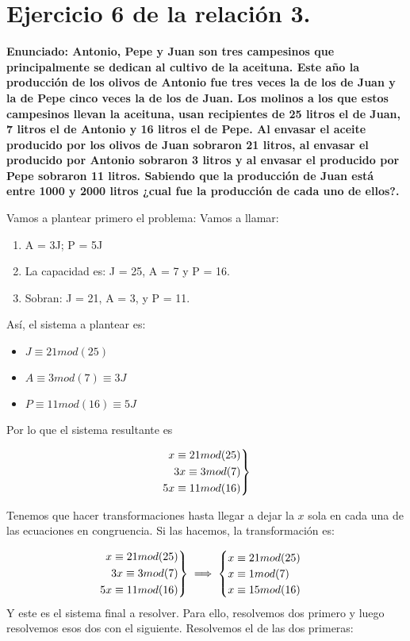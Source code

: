 \documentclass[11pt, a4paper, titlepage]{article}
\theoremstyle{theorem-style}
\theoremstyle{definition-style}
\theoremstyle{remark-style}
\theoremstyle{example-style}
\newenvironment{rcases}
  {\left.\begin{aligned}}
  {\end{aligned}\right\rbrace}
\begin{document}
\newpage
\section{Ejercicio 6 de la relación 3.}

\textbf{Enunciado: Antonio, Pepe y Juan son tres campesinos que principalmente se
dedican al cultivo de la aceituna. Este año la producción de los olivos de
Antonio fue tres veces la de los de Juan y la de Pepe cinco veces la de los
de Juan. Los molinos a los que estos campesinos llevan la aceituna, usan
recipientes de 25 litros el de Juan, 7 litros el de Antonio y 16 litros el de
Pepe. Al envasar el aceite producido por los olivos de Juan sobraron 21
litros, al envasar el producido por Antonio sobraron 3 litros y al envasar el
producido por Pepe sobraron 11 litros. Sabiendo que la producción de Juan
está entre 1000 y 2000 litros ¿cual fue la producción de cada uno de ellos?.}

Vamos a plantear primero el problema: Vamos a llamar:
\begin{enumerate}
	\item A = 3J; P = 5J
	\item La capacidad es: J = 25, A = 7 y P = 16.
	\item Sobran: J = 21, A = 3, y P = 11.
\end{enumerate}

Así, el sistema a plantear es:

\begin{itemize}
	\item $J \equiv 21 mod(25)$
	\item $A \equiv 3 mod(7) \equiv 3J$
	\item $P \equiv 11 mod(16) \equiv 5J$
\end{itemize}

Por lo que el sistema resultante es

\[
\begin{rcases}
	x \equiv 21 mod(25)\\
	3x \equiv 3 mod(7)\\
	5x \equiv 11 mod(16)
\end{rcases}
\]

Tenemos que hacer transformaciones hasta llegar a dejar la $x$ sola en cada una de las ecuaciones en congruencia. Si las hacemos, la transformación es:



\[
\begin{rcases}
	x \equiv 21 mod(25)\\
	3x \equiv 3 mod(7)\\
	5x \equiv 11 mod(16)
\end{rcases} \implies \begin{cases}
	 x \equiv 21 mod(25)\\
	 x \equiv 1 mod(7)\\
	 x \equiv 15 mod(16)
\end{cases}
\]
Y este es el sistema final a resolver. Para ello, resolvemos dos primero y luego resolvemos esos dos con el siguiente. Resolvemos el de las dos primeras:
\end{document}
